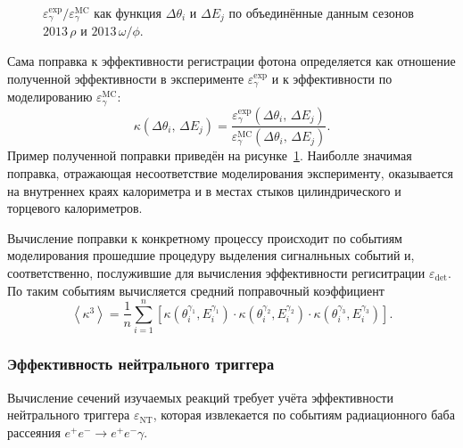 \begin{figure}[htbp]
\begin{minipage}[t]{0.48\textwidth}
        \caption{$\varepsilon_{\gamma}^{\text{exp}} / \varepsilon_{\gamma}^{\text{MC}}$ как функция $\Delta \theta_i$ и $\Delta E_j$
        	по объединённые данным сезонов $2013 \, \rho$ и $2013 \, \omega / \phi$.}\label{fig:3pi_eff_gamma_corr}
    \end{minipage}
\end{figure}

Сама поправка к эффективности регистрации фотона определяется как отношение полученной эффективности в эксперименте $\varepsilon_{\gamma}^{\text{exp}}$
и к эффективности по моделированию $\varepsilon_{\gamma}^{\text{MC}}$:
\begin{equation}
    \kappa ( \Delta \theta_i, \, \Delta E_j )
    =
    \frac{
        \varepsilon_{\gamma}^{\text{exp}} ( \Delta \theta_i, \, \Delta E_j )
    }{
        \varepsilon_{\gamma}^{\text{MC}} ( \Delta \theta_i, \, \Delta E_j )
    }.
\end{equation}
Пример полученной поправки приведён на рисунке~\ref{fig:3pi_eff_gamma_corr}.
Наиболле значимая поправка,
отражающая несоответствие моделирования эксперименту,
оказывается на внутреннех краях  калориметра и в местах стыков цилиндрического и торцевого калориметров.

Вычисление поправки к конкретному процессу происходит по событиям моделирования прошедшие процедуру выделения сигналньных событий и,
соответственно,
послужившие для вычисления эффективности региситрации $\varepsilon_{\text{det}}$.
По таким событиям вычисляется средний поправочный коэффициент
\begin{equation}
    \left\langle \kappa^3 \right\rangle
    =
    \frac{1}{n}
    \sum_{i=1}^{n}
    \left[
        \kappa( \theta_i^{\gamma_1}, E_i^{\gamma_1} )
        \cdot
        \kappa( \theta_i^{\gamma_2}, E_i^{\gamma_2} )
        \cdot
        \kappa( \theta_i^{\gamma_3}, E_i^{\gamma_3} )
    \right] .
\end{equation}




\subsubsection{Эффективность нейтрального триггера}

Вычисление сечений изучаемых реакций требует учёта эффективности нейтрального триггера $\varepsilon_\text{NT}$,
которая извлекается по событиям радиационного баба рассеяния $e^+e^- \to e^+e^-\gamma$.


